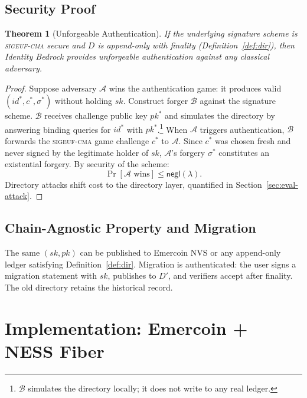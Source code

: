 \documentclass[12pt,a4paper]{article}
\newtheorem{theorem}{Theorem}
\begin{document}
\subsection{Security Proof}

\begin{theorem}[Unforgeable Authentication]
\label{thm:auth}
If the underlying signature scheme is \textsc{sigeuf-cma} secure and $D$
is append-only with finality (Definition~\ref{def:dir}), then Identity
Bedrock provides unforgeable authentication against any classical
adversary.
\end{theorem}

\begin{proof}
Suppose adversary $\mathcal{A}$ wins the authentication game: it produces
valid $(\mathit{id}^*, c^*, \sigma^*)$ without holding $sk$. Construct
forger $\mathcal{B}$ against the signature scheme. $\mathcal{B}$ receives
challenge public key $pk^*$ and simulates the directory by answering
binding queries for $\mathit{id}^*$ with
$pk^*$.\footnote{$\mathcal{B}$ simulates the directory locally; it does
not write to any real ledger.} When $\mathcal{A}$ triggers
authentication, $\mathcal{B}$ forwards the \textsc{sigeuf-cma} game
challenge $c^*$ to $\mathcal{A}$. Since $c^*$ was chosen fresh and never
signed by the legitimate holder of $sk$, $\mathcal{A}$'s forgery
$\sigma^*$ constitutes an existential forgery. By security of the
scheme:
\[
  \Pr[\mathcal{A}\text{ wins}] \leq \mathsf{negl}(\lambda).
\]
Directory attacks shift cost to the directory layer, quantified in
Section~\ref{sec:eval-attack}.
\end{proof}

\subsection{Chain-Agnostic Property and Migration}

The same $(sk, pk)$ can be published to Emercoin NVS or any append-only
ledger satisfying Definition~\ref{def:dir}. Migration is authenticated:
the user signs a migration statement with $sk$, publishes to $D'$, and
verifiers accept after finality. The old directory retains the historical
record.

\section{Implementation: Emercoin + NESS Fiber}
\label{sec:implementation}
\end{document}
